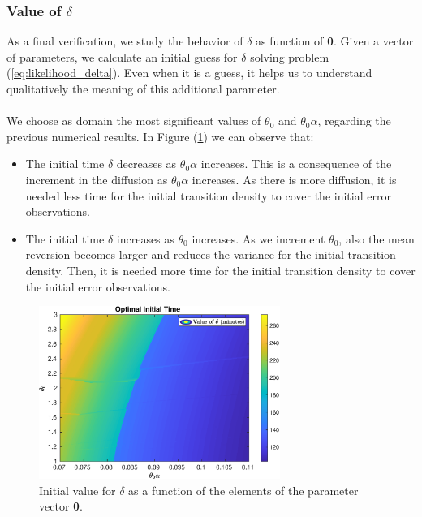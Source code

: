 \documentclass[11pt]{article}
\theoremstyle{definition}
\begin{document}
\subsubsection{Value of $\delta$}
As a final verification, we study the behavior of $\delta$ as function of $\bm{\theta}$. Given a vector of parameters, we calculate an initial guess for $\delta$ solving problem (\ref{eq:likelihood_delta}). Even when it is a guess, it helps us to understand qualitatively the meaning of this additional parameter.\\
\quad\\
We choose as domain the most significant values of $\theta_0$ and $\theta_0\alpha$, regarding the previous numerical results. In Figure (\ref{fig:delta}) we can observe that:
\begin{itemize}
\item The initial time $\delta$ decreases as $\theta_0\alpha$ increases. This is a consequence of the increment in the diffusion as $\theta_0\alpha$ increases. As there is more diffusion, it is needed less time for the initial transition density to cover the initial error observations.
\item The initial time $\delta$ increases as $\theta_0$ increases. As we increment $\theta_0$, also the mean reversion becomes larger and reduces the variance for the initial transition density. Then, it is needed more time for the initial transition density to cover the initial error observations.
\end{itemize}

\begin{figure}[H]
\centering
\includegraphics[width=0.7\textwidth]{../../MATLAB_Files/Results/delta/contour_delta.eps}
\caption{Initial value for $\delta$ as a function of the elements of the parameter vector $\bm{\theta}$.}
\label{fig:delta}
\end{figure}
\end{document}
